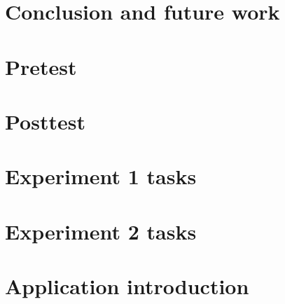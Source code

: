 \documentclass[12pt,a4paper]{book}
\begin{document}
\chapter{Conclusion and future work}\label{part:conclusion}


\clearpage


\begin{appendices}
	\chapter{Pretest}\label{appendix:pretest}
		
	\chapter{Posttest}\label{appendix:posttest}
			
	\chapter{Experiment 1 tasks}\label{appendix:experiment1}
			
	\chapter{Experiment 2 tasks}\label{appendix:experiment2}
			
	\chapter{Application introduction}\label{appendix:appIntro}
		
\end{appendices}
\end{document}

